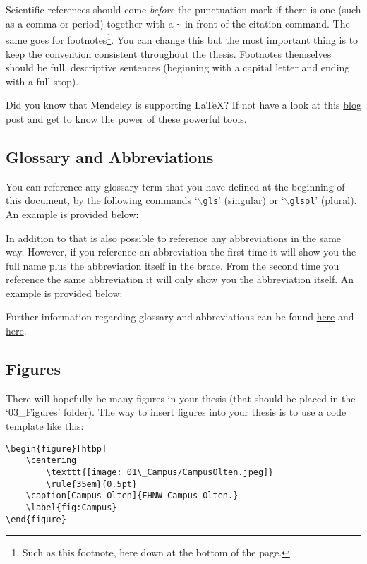Scientific references should come \emph{before} the punctuation mark if there is one (such as a comma or period) together with a \verb!~! in front of the citation command. The same goes for footnotes\footnote{Such as this footnote, here down at the bottom of the page.}. You can change this but the most important thing is to keep the convention consistent throughout the thesis. Footnotes themselves should be full, descriptive sentences (beginning with a capital letter and ending with a full stop).

Did you know that Mendeley is supporting \LaTeX{}? If not have a look at this \href{http://blog.mendeley.com/tipstricks/howto-use-mendeley-to-create-citations-using-latex-and-bibtex/}{blog post} and get to know the power of these powerful tools.

\subsection{Glossary and Abbreviations}

You can reference any glossary term that you have defined at the beginning of this document, by the following commands `$\backslash$\texttt{gls}' (singular) or `$\backslash$\texttt{glspl}' (plural). An example is provided below:

In addition to that is also possible to reference any abbreviations in the same way. However, if you reference an abbreviation the first time it will show you the full name plus the abbreviation itself in the brace. From the second time you reference the same abbreviation it will only show you the abbreviation itself. An example is provided below:


Further information regarding glossary and abbreviations can be found \href{http://www.ctan.org/pkg/glossaries}{here} and \href{http://latex-community.org/know-how/latex/55-latex-general/263-glossaries-nomenclature-lists-of-symbols-and-acronyms}{here}.

\subsection{Figures}

There will hopefully be many figures in your thesis (that should be placed in the `03\_Figures' folder). The way to insert figures into your thesis is to use a code template like this:

\begin{verbatim}
\begin{figure}[htbp]
	\centering
		\texttt{[image: 01\_Campus/CampusOlten.jpeg]}
		\rule{35em}{0.5pt}
	\caption[Campus Olten]{FHNW Campus Olten.}
	\label{fig:Campus}
\end{figure}
\end{verbatim}

